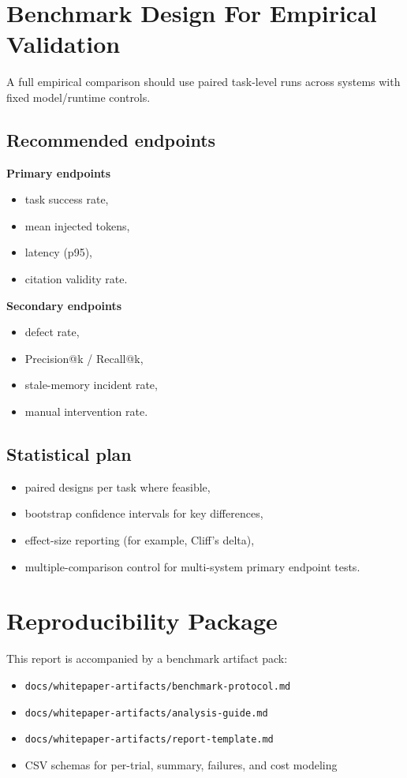 \documentclass[11pt]{article}
\begin{document}
\section{Benchmark Design For Empirical Validation}
A full empirical comparison should use paired task-level runs across systems with fixed model/runtime controls.

\subsection{Recommended endpoints}
\textbf{Primary endpoints}
\begin{itemize}
  \item task success rate,
  \item mean injected tokens,
  \item latency (p95),
  \item citation validity rate.
\end{itemize}

\textbf{Secondary endpoints}
\begin{itemize}
  \item defect rate,
  \item Precision@k / Recall@k,
  \item stale-memory incident rate,
  \item manual intervention rate.
\end{itemize}

\subsection{Statistical plan}
\begin{itemize}
  \item paired designs per task where feasible,
  \item bootstrap confidence intervals for key differences,
  \item effect-size reporting (for example, Cliff's delta),
  \item multiple-comparison control for multi-system primary endpoint tests.
\end{itemize}

\section{Reproducibility Package}
This report is accompanied by a benchmark artifact pack:
\begin{itemize}
  \item \texttt{docs/whitepaper-artifacts/benchmark-protocol.md}
  \item \texttt{docs/whitepaper-artifacts/analysis-guide.md}
  \item \texttt{docs/whitepaper-artifacts/report-template.md}
  \item CSV schemas for per-trial, summary, failures, and cost modeling
\end{itemize}
\end{document}
